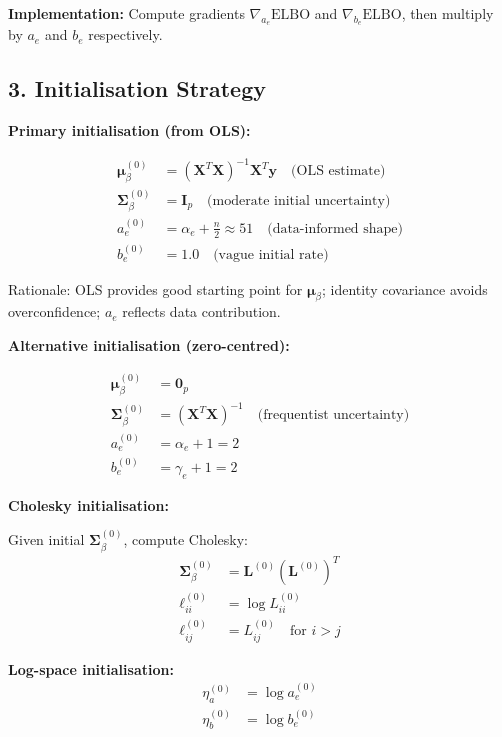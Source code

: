 \documentclass[11pt]{article}
\newcommand{\ELBO}{\text{ELBO}}
\begin{document}
\textbf{Implementation:} Compute gradients $\nabla_{a_e} \ELBO$ and $\nabla_{b_e} \ELBO$, then multiply by $a_e$ and $b_e$ respectively.

\subsection*{3. Initialisation Strategy}

\textbf{Primary initialisation (from OLS):}

\begin{align}
\bm{\mu}_\beta^{(0)} &= (\bm{X}^T \bm{X})^{-1} \bm{X}^T \bm{y} \quad \text{(OLS estimate)}\\
\bm{\Sigma}_\beta^{(0)} &= \bm{I}_p \quad \text{(moderate initial uncertainty)}\\
a_e^{(0)} &= \alpha_e + \frac{n}{2} \approx 51 \quad \text{(data-informed shape)}\\
b_e^{(0)} &= 1.0 \quad \text{(vague initial rate)}
\end{align}

Rationale: OLS provides good starting point for $\bm{\mu}_\beta$; identity covariance avoids overconfidence; $a_e$ reflects data contribution.

\textbf{Alternative initialisation (zero-centred):}

\begin{align}
\bm{\mu}_\beta^{(0)} &= \bm{0}_p\\
\bm{\Sigma}_\beta^{(0)} &= (\bm{X}^T \bm{X})^{-1} \quad \text{(frequentist uncertainty)}\\
a_e^{(0)} &= \alpha_e + 1 = 2\\
b_e^{(0)} &= \gamma_e + 1 = 2
\end{align}

\textbf{Cholesky initialisation:}

Given initial $\bm{\Sigma}_\beta^{(0)}$, compute Cholesky:
\begin{align}
\bm{\Sigma}_\beta^{(0)} &= \bm{L}^{(0)} (\bm{L}^{(0)})^T\\
\ell_{ii}^{(0)} &= \log L_{ii}^{(0)}\\
\ell_{ij}^{(0)} &= L_{ij}^{(0)} \quad \text{for } i > j
\end{align}

\textbf{Log-space initialisation:}
\begin{align}
\eta_a^{(0)} &= \log a_e^{(0)}\\
\eta_b^{(0)} &= \log b_e^{(0)}
\end{align}
\end{document}

